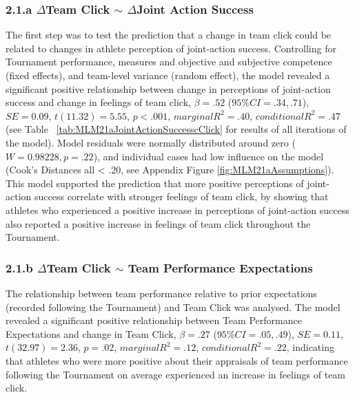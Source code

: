 \subsubsection{2.1.a $\Delta$Team Click $\sim$ $\Delta$Joint Action Success}
The first step was to test the prediction that a change in team click could be related to changes in athlete perception of joint-action success. Controlling for Tournament performance, measures and objective and subjective competence (fixed effects), and team-level variance (random effect), the model revealed a significant positive relationship between change in perceptions of joint-action success and change in feelings of team click, $\beta = .52$ ($95\% CI =  .34, .71$), $SE = 0.09$, $t(11.32) = 5.55$, $p < .001$, $marginal R^2 = .40$, $conditional R^2 = .47$ (see Table ~\ref{tab:MLM21aJointActionSuccesscClick} for results of all iterations of the model).  Model residuals were normally distributed around zero ($W = 0.98228, p = .22$), and individual cases had low influence on the model (Cook's Distances all < .20, see Appendix Figure \ref{fig:MLM21aAssumptions}).  This model supported the prediction that more positive perceptions of joint-action success correlate with stronger feelings of team click, by showing that athletes who experienced a positive increase in perceptions of joint-action success also reported a positive increase in feelings of team click throughout the Tournament.







\subsubsection{2.1.b $\Delta$Team Click $\sim$ Team Performance Expectations}

The relationship between team performance relative to prior expectations (recorded following the Tournament) and Team Click was analysed. The model revealed a significant positive relationship between Team Performance Expectations and change in Team Click,  $\beta = .27$ ($95\% CI =  .05, .49$), $SE = 0.11$, $t(32.97) = 2.36$, $p = .02$, $marginal R^2 = .12$, $conditional R^2 = .22$, indicating that athletes who were more positive about their appraisals of team performance following the Tournament on average experienced an increase in feelings of team click.

